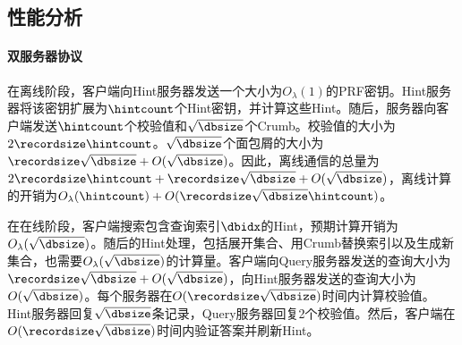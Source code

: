 


\subsection{性能分析}
\paragraph{双服务器协议}
在离线阶段，客户端向Hint服务器发送一个大小为$O_\lambda(1)$的PRF密钥。Hint服务器将该密钥扩展为$\hintcount$个Hint密钥，并计算这些Hint。随后，服务器向客户端发送$\hintcount$个校验值和$\sqrt{\dbsize}$个Crumb。校验值的大小为$2\recordsize\hintcount$。$\sqrt{\dbsize}$个面包屑的大小为$\recordsize\sqrt{\dbsize} + O(\sqrt{\dbsize})$。因此，离线通信的总量为$2\recordsize\hintcount + \recordsize\sqrt{\dbsize} + O(\sqrt{\dbsize})$，离线计算的开销为$O_\lambda(\hintcount) + O(\recordsize\sqrt{\dbsize}\hintcount)$。

在在线阶段，客户端搜索包含查询索引$\dbidx$的Hint，预期计算开销为$O_\lambda(\sqrt{\dbsize})$。随后的Hint处理，包括展开集合、用Crumb替换索引以及生成新集合，也需要$O_\lambda(\sqrt{\dbsize})$的计算量。客户端向Query服务器发送的查询大小为$\recordsize\sqrt{\dbsize} + O(\sqrt{\dbsize})$，向Hint服务器发送的查询大小为$O(\sqrt{\dbsize})$。每个服务器在$O(\recordsize\sqrt{\dbsize})$时间内计算校验值。Hint服务器回复$\sqrt{\dbsize}$条记录，Query服务器回复2个校验值。然后，客户端在$O(\recordsize\sqrt{\dbsize})$时间内验证答案并刷新Hint。

